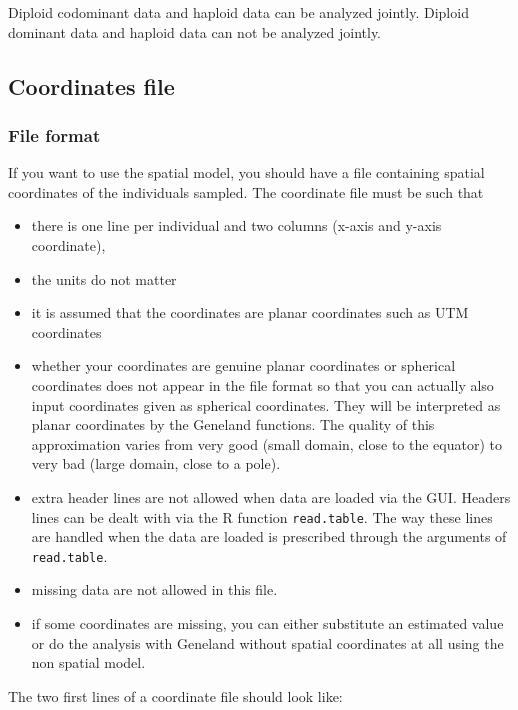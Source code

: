 \documentclass{article}
\begin{document}
Diploid codominant data and haploid  data can be analyzed jointly.
Diploid dominant data and haploid data can not be analyzed jointly.

\subsection{Coordinates file}


\subsubsection{File format}

If you want to use the spatial model, you should  have a file containing spatial coordinates of the individuals sampled.
The coordinate  file must be such that  
\begin{itemize}
\item there is one line per individual and two columns (x-axis and y-axis coordinate), 
\item the units do not matter
\item it is assumed that the coordinates are planar coordinates such as 
UTM coordinates 
\item whether your coordinates are genuine planar coordinates or spherical coordinates does not 
appear in the file  format so that you can actually 
also input coordinates given as spherical coordinates. 
They will be interpreted as planar coordinates by 
the {\sc Geneland} functions. The quality of this approximation varies from very good (small domain, close to the equator) 
to very bad (large domain, close to a pole). 
\item extra header lines are not allowed when data are loaded via the GUI. 
Headers lines can be dealt with via the R function \texttt{read.table}. 
 The way these lines are handled when the data are loaded is prescribed 
through the arguments of \texttt{read.table}. 
\item missing data are not allowed in this file. 
\item if some coordinates are missing, you can either substitute an estimated value 
or do the analysis with {\sc Geneland} without spatial coordinates at all using the non spatial model. 
\end{itemize}


The two first lines  of a coordinate file should look like:\\
\end{document}
